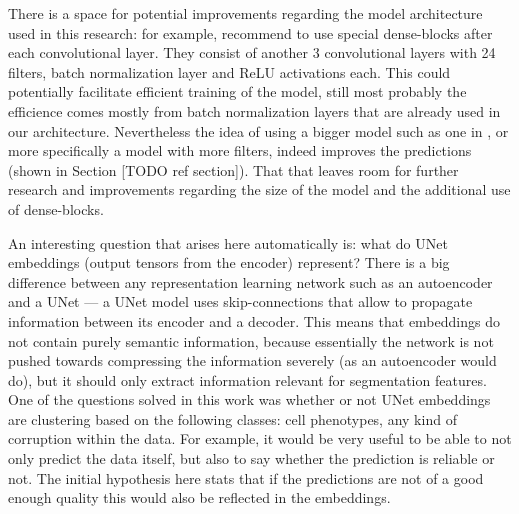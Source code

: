 There is a space for potential improvements regarding the model architecture used in this research: for example, \cite{Cheng_2021} recommend to use special dense-blocks after each convolutional layer. They consist of another 3 convolutional layers with 24 filters, batch normalization layer and ReLU activations each. This could potentially facilitate efficient training of the model, still most probably the efficience comes mostly from batch normalization layers that are already used in our architecture. Nevertheless the idea of using a bigger model such as one in \cite{Cheng_2021}, or more specifically a model with more filters, indeed improves the predictions (shown in Section [TODO ref section]). That that leaves room for further research and improvements regarding the size of the model and the additional use of dense-blocks.

An interesting question that arises here automatically is: what do UNet embeddings (output tensors from the encoder) represent? There is a big difference between any representation learning network such as an autoencoder and a UNet --- a UNet model uses skip-connections that allow to propagate information between its encoder and a decoder. This means that embeddings do not contain purely semantic information, because essentially the network is not pushed towards compressing the information severely (as an autoencoder would do), but it should only extract information relevant for segmentation features. One of the questions solved in this work was whether or not UNet embeddings are clustering based on the following classes: cell phenotypes, any kind of corruption within the data. For example, it would be very useful to be able to not only predict the data itself, but also to say whether the prediction is reliable or not. The initial hypothesis here stats that if the predictions are not of a good enough quality this would also be reflected in the embeddings.